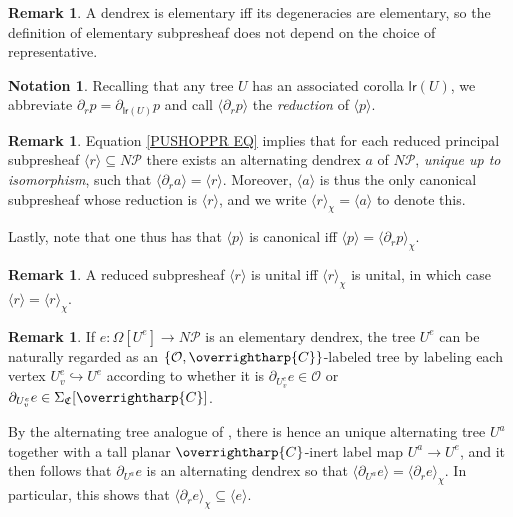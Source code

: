 \documentclass[a4paper,10pt]{article}%
\numberwithin{equation}{section}
\numberwithin{figure}{section}
\theoremstyle{definition} %
\newtheorem{remark}[equation]{Remark}%
\newtheorem{notation}[equation]{Notation}%
\newcommand{\into}{\hookrightarrow}%
\newcommand{\vect}[1]{\text{\overrightharp{\ensuremath{#1}}}}
\renewcommand{\O}{\ensuremath{\mathcal O}}
\newcommand{\1}{\ensuremath{\mathbbm 1}}%
\begin{document}
\begin{remark}
	A dendrex is elementary iff its degeneracies are elementary,
	so the definition of elementary subpresheaf does not depend on the choice of representative.
\end{remark}


\begin{notation}
	Recalling that any tree $U$
	has an associated corolla $\mathsf{lr}(U)$, 
	we abbreviate
	$\partial_r p = \partial_{\mathsf{lr}(U)}p$
	and call
	$\langle \partial_r p \rangle$
	the \emph{reduction} of  
	$\langle p \rangle$.
\end{notation}




\begin{remark}\label{PUSHOPPRRST REM}
	Equation \eqref{PUSHOPPR EQ} 
	implies
	that for each reduced principal subpresheaf
	$\langle r \rangle \subseteq N \mathcal{P}$
	there exists an alternating dendrex $a$ of $N \mathcal P$, 
	\emph{unique up to isomorphism}, 
	such that
	$\langle \partial_r a \rangle = \langle r \rangle$.
	Moreover, $\langle a \rangle$ is thus the only canonical subpresheaf whose reduction is 
	$\langle r \rangle$,
	and we write
	$\langle r \rangle_{\chi} = \langle a \rangle$
	to denote this.
	
	Lastly, note that one thus has that 
	$\langle p \rangle$ is canonical iff
	$\langle p \rangle = \langle \partial_r p \rangle_{\chi}$.
\end{remark}


\begin{remark}\label{UNITALCASE REM}
	A reduced subpresheaf $\langle r \rangle$
	is unital iff 
	$\langle r \rangle_{\chi}$ is unital, in which case
	$\langle r \rangle = \langle r \rangle_{\chi}$.
\end{remark}



\begin{remark}\label{ELEMLABEL REM}
	If $e \colon \Omega[U^e] \to N \mathcal{P}$
	is an elementary dendrex, 
	the tree $U^e$ can be naturally regarded as an
	$\{\O,\vect{C}\}$-labeled tree by labeling each vertex $U^e_v \into U^e$ according to whether
	it is $\partial_{U^e_v} e \in \O $ or
	$ \partial_{U^e_v} e \in \Sigma_{\mathfrak{C}}[\vect{C}]$.
	
	By the alternating tree analogue of
	\cite[Prop. 5.49]{BP_geo}, there is hence an unique alternating tree $U^a$ together with a tall planar $\vect{C}$-inert label map $U^a \to U^e$,
	and it then follows that
	$\partial_{U^a} e$ is an alternating dendrex so that
	$\langle \partial_{U^a} e \rangle = \langle \partial_r e \rangle_{\chi}$.
	In particular, this shows that
	$\langle \partial_r e \rangle_{\chi} \subseteq 
	\langle e \rangle$.
\end{remark}
\end{document}
